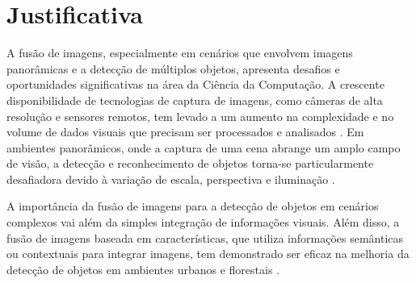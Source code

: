 

\section{Justificativa}\label{sec:justificativa}

A fusão de imagens, especialmente em cenários que envolvem imagens panorâmicas e a detecção de múltiplos objetos, apresenta desafios e oportunidades significativas na área da Ciência da Computação. A crescente disponibilidade de tecnologias de captura de imagens, como câmeras de alta resolução e sensores remotos, tem levado a um aumento na complexidade e no volume de dados visuais que precisam ser processados e analisados \cite{smith2023}. Em ambientes panorâmicos, onde a captura de uma cena abrange um amplo campo de visão, a detecção e reconhecimento de objetos torna-se particularmente desafiadora devido à variação de escala, perspectiva e iluminação \cite{gupta2022}.

A importância da fusão de imagens para a detecção de objetos em cenários complexos vai além da simples integração de informações visuais.  Além disso, a fusão de imagens baseada em características, que utiliza informações semânticas ou contextuais para integrar imagens, tem demonstrado ser eficaz na melhoria da detecção de objetos em ambientes urbanos e florestais \cite{guan2023}. 

